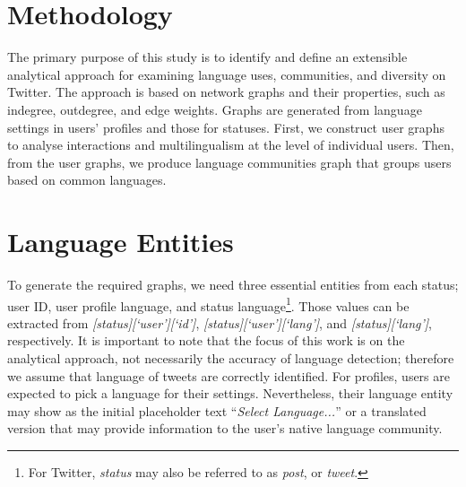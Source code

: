 \documentclass{llncs}
\begin{document}
\section{Methodology}\label{methodology}

The primary purpose of this study is to identify and define an
extensible analytical approach for examining language uses,
communities, and diversity on Twitter. The approach is based on
network graphs and their properties, such as indegree, outdegree, and
edge weights. Graphs are generated from language settings in users'
profiles and those for statuses.  First, we construct user graphs to
analyse interactions and multilingualism at the level of individual
users. Then, from the user graphs, we produce language communities
graph that groups users based on common languages.

\section{Language Entities}

To generate the required graphs, we need three essential entities from
each status; user ID, user profile language, and status
language\footnote{For Twitter, \emph{status} may also be referred to
as \emph{post}, or \emph{tweet}.}.  Those values can be extracted from
{\emph{[status][`user'][`id']}}, {\emph{[status][`user'][`lang']}},
and {\emph{[status][`lang']}}, respectively. It is important to note
that the focus of this work is on the analytical approach, not
necessarily the accuracy of language detection; therefore we assume
that language of tweets are correctly identified.
For profiles, users are expected to pick a language for their
settings. Nevertheless, their language entity may show as the initial
placeholder text ``\emph{Select Language...}'' or a translated version
that may provide information to the user's native language community.

\end{document}
